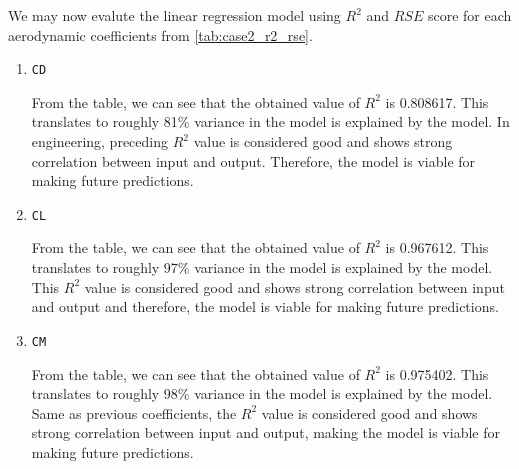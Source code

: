 \documentclass[conf]{new-aiaa}
\begin{document}
We may now evalute the linear regression model using $R^2$ and $RSE$ score for each aerodynamic coefficients from \ref{tab:case2_r2_rse}.
\begin{enumerate}
    \item \texttt{CD}
    
    From the table, we can see that the obtained value of $R^2$ is 0.808617. This translates to roughly 81\% variance in the model is explained by the model. In engineering, preceding $R^2$ value is considered good and shows strong correlation between input and output. Therefore, the model is viable for making future predictions.
    \item \texttt{CL}
    
    From the table, we can see that the obtained value of $R^2$ is 0.967612. This translates to roughly 97\% variance in the model is explained by the model. This $R^2$ value is considered good and shows strong correlation between input and output and therefore, the model is viable for making future predictions.
    \item \texttt{CM}
    
    From the table, we can see that the obtained value of $R^2$ is 0.975402. This translates to roughly 98\% variance in the model is explained by the model. Same as previous coefficients, the $R^2$ value is considered good and shows strong correlation between input and output, making the model is viable for making future predictions.
\end{enumerate}
\end{document}
